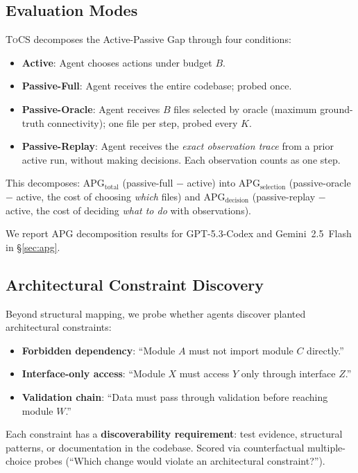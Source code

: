 \documentclass{article}
\newcommand{\tocs}{\textsc{ToCS}}
\begin{document}
\subsection{Evaluation Modes}

\tocs{} decomposes the Active-Passive Gap through four conditions:
\begin{itemize}[nosep]
    \item \textbf{Active}: Agent chooses actions under budget $B$.
    \item \textbf{Passive-Full}: Agent receives the entire codebase; probed once.
    \item \textbf{Passive-Oracle}: Agent receives $B$ files selected by oracle (maximum ground-truth connectivity); one file per step, probed every $K$.
    \item \textbf{Passive-Replay}: Agent receives the \emph{exact observation trace} from a prior active run, without making decisions. Each observation counts as one step.
\end{itemize}

This decomposes: $\text{APG}_\text{total}$ (passive-full $-$ active) into $\text{APG}_\text{selection}$ (passive-oracle $-$ active, the cost of choosing \emph{which} files) and $\text{APG}_\text{decision}$ (passive-replay $-$ active, the cost of deciding \emph{what to do} with observations).

\noindent We report APG decomposition results for GPT-5.3-Codex and Gemini~2.5~Flash in \S\ref{sec:apg}.

\subsection{Architectural Constraint Discovery}

Beyond structural mapping, we probe whether agents discover planted architectural constraints:
\begin{itemize}[nosep]
    \item \textbf{Forbidden dependency}: ``Module $A$ must not import module $C$ directly.''
    \item \textbf{Interface-only access}: ``Module $X$ must access $Y$ only through interface $Z$.''
    \item \textbf{Validation chain}: ``Data must pass through validation before reaching module $W$.''
\end{itemize}
Each constraint has a \textbf{discoverability requirement}: test evidence, structural patterns, or documentation in the codebase. Scored via counterfactual multiple-choice probes (``Which change would violate an architectural constraint?'').
\end{document}
